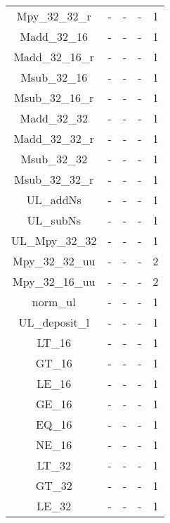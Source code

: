 \begin{longtable}{|c|c|c|c|c|}
Mpy\_32\_32\_r          & -       & -       & -       & 1        \\
Madd\_32\_16            & -       & -       & -       & 1        \\
Madd\_32\_16\_r         & -       & -       & -       & 1        \\
Msub\_32\_16            & -       & -       & -       & 1        \\
Msub\_32\_16\_r         & -       & -       & -       & 1        \\
Madd\_32\_32            & -       & -       & -       & 1        \\
Madd\_32\_32\_r         & -       & -       & -       & 1        \\
Msub\_32\_32            & -       & -       & -       & 1        \\
Msub\_32\_32\_r         & -       & -       & -       & 1        \\
UL\_addNs               & -       & -       & -       & 1        \\
UL\_subNs               & -       & -       & -       & 1        \\
UL\_Mpy\_32\_32         & -       & -       & -       & 1        \\
Mpy\_32\_32\_uu         & -       & -       & -       & 2        \\
Mpy\_32\_16\_uu         & -       & -       & -       & 2        \\
norm\_ul                & -       & -       & -       & 1        \\
UL\_deposit\_l          & -       & -       & -       & 1        \\
LT\_16                  & -       & -       & -       & 1        \\
GT\_16                  & -       & -       & -       & 1        \\
LE\_16                  & -       & -       & -       & 1        \\
GE\_16                  & -       & -       & -       & 1        \\
EQ\_16                  & -       & -       & -       & 1        \\
NE\_16                  & -       & -       & -       & 1        \\
LT\_32                  & -       & -       & -       & 1        \\
GT\_32                  & -       & -       & -       & 1        \\
LE\_32                  & -       & -       & -       & 1        \\

\end{longtable}
